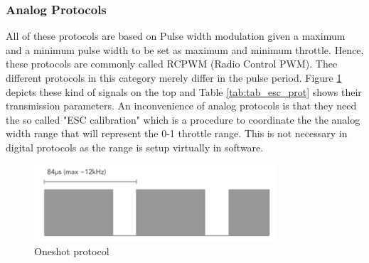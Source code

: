 \subsubsection{Analog Protocols}
All of these protocols are based on Pulse width modulation given a maximum and a minimum pulse width to be set as maximum and minimum throttle. Hence, these protocols are commonly called RCPWM (Radio Control PWM). Thee different protocols in this category merely differ in the pulse period. Figure \ref{fig:oneshot} depicts these kind of signals on the top and Table \ref{tab:tab_esc_prot}  shows their transmission parameters. An inconvenience of analog protocols is that they need the so called "ESC calibration" which is a procedure to coordinate the the analog width range that will represent the 0-1 throttle range. This is not necessary in digital protocols as the range is setup virtually in software.

\begin{figure}
    \centering
    \includegraphics[width=0.8\textwidth]{images/oneshot_sketch.png}
    \caption{Oneshot protocol \cite{BackyardRobotics2018}}
    \label{fig:oneshot}
\end{figure}


